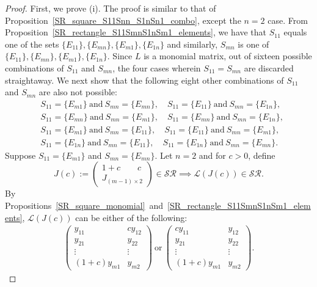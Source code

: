 \documentclass[10pt,a4paper]{amsart}
\begin{document}
	\begin{proof} First, we prove (i). The proof is similar to that
	of Proposition~\ref{SR_square_S11Snn_S1nSn1_combo}, except the $n=2$ case. From Proposition~\ref{SR_rectangle_S11SmnS1nSm1_elements}, we have that $S_{11}$ equals one of the sets $\{E_{11}\}, \{E_{mn}\}, \{E_{m1}\}, \{E_{1n}\}$ and similarly, $S_{mn}$ is one of $\{E_{11}\}, \{E_{mn}\}, \{E_{m1}\}, \{E_{1n}\}$. Since $L$ is a  monomial matrix, out of sixteen possible combinations of $S_{11}$ and $S_{mn}$, the four cases wherein $S_{11}=S_{mn}$ are discarded straightaway. We next show that the following eight other combinations of $S_{11}$ and $S_{mn}$ are also not possible:
	\begin{align*}
		&S_{11}=\{E_{m1}\} ~\text{and}~ S_{mn}=\{E_{mn}\}, \quad 
		S_{11}=\{E_{11}\} ~\text{and}~ S_{mn}=\{E_{1n}\}, \\
		&S_{11}=\{E_{mn}\} ~\text{and}~ S_{mn}=\{E_{m1}\}, \quad 
		S_{11}=\{E_{mn}\} ~\text{and}~ S_{mn}=\{E_{1n}\}, \\
		&S_{11}=\{E_{m1}\} ~\text{and}~ S_{mn}=\{E_{11}\}, \quad
		S_{11}=\{E_{11}\} ~\text{and}~ S_{mn}=\{E_{m1}\}, \\
		&S_{11}=\{E_{1n}\}~\text{and}~ S_{mn}=\{E_{11}\}, \quad
		S_{11}=\{E_{1n}\}~\text{and}~ S_{mn}=\{E_{mn}\}.
	\end{align*}
	Suppose $S_{11}=\{E_{m1}\}$ and $S_{mn}=\{E_{mn}\}$. Let $n=2$ and for $c>0$, define
		\[J(c):= \begin{pmatrix}
			1+c \qquad c \\
			J_{(m-1) \times 2}
		\end{pmatrix}\in \mathcal{SR}\implies \mathcal{L}(J(c))\in \mathcal{SR}.\]
	By Propositions~\ref{SR_square_monomial}~and~\ref{SR_rectangle_S11SmnS1nSm1_elements}, $\mathcal{L}(J(c))$ can be either of the following:
	\begin{align*}
		\begin{pmatrix}
			y_{11} & cy_{12} \\
			y_{21} & y_{22} \\
			\vdots & \vdots \\
			(1+c)y_{m1} & y_{m2}
		\end{pmatrix}~\text{or}~\begin{pmatrix}
			cy_{11} & y_{12} \\
			y_{21} & y_{22} \\
			\vdots & \vdots \\
			(1+c)y_{m1} & y_{m2}
		\end{pmatrix}.
	\end{align*}

\end{proof}
\end{document}
